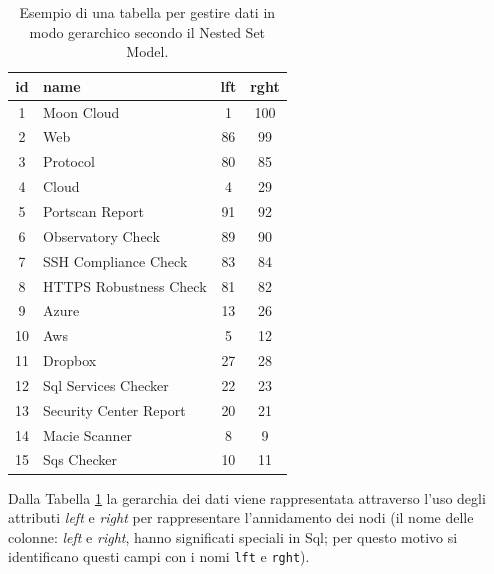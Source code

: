 \begin{table}[ht!]
\centering
\begin{tabular}[c]{| c | l | c | c |}
    \hline
    id & name & lft & rght \\ [0.5ex] 
    \hline
    \rowcolor{rootnodecell} 1 & Moon Cloud & 1 & 100 \\ [0.5ex] 
    \rowcolor{categorycell} 2 & Web & 86 & 99 \\ [0.5ex] 
    \rowcolor{categorycell} 3 & Protocol & 80 & 85 \\ [0.5ex] 
    \rowcolor{categorycell} 4 & Cloud & 4 & 29 \\ [0.5ex] 
    \rowcolor{evaluationcell} 5 & Portscan Report & 91 & 92 \\ [0.5ex] 
    \rowcolor{evaluationcell} 6 & Observatory Check & 89 & 90 \\ [0.5ex] 
    \rowcolor{evaluationcell} 7 & SSH Compliance Check & 83 & 84 \\ [0.5ex] 
    \rowcolor{evaluationcell} 8 & HTTPS Robustness Check & 81 & 82 \\ [0.5ex] 
    \rowcolor{categorycell} 9 & Azure & 13 & 26 \\ [0.5ex] 
    \rowcolor{categorycell} 10 & Aws & 5 & 12 \\ [0.5ex] 
    \rowcolor{categorycell} 11 & Dropbox & 27 & 28 \\ [0.5ex] 
    \rowcolor{evaluationcell} 12 & Sql Services Checker & 22 & 23 \\ [0.5ex] 
    \rowcolor{evaluationcell} 13 & Security Center Report & 20 & 21 \\ [0.5ex] 
    \rowcolor{evaluationcell} 14 & Macie Scanner & 8 & 9 \\ [0.5ex] 
    \rowcolor{evaluationcell} 15 & Sqs Checker & 10 & 11 \\ [0.5ex]
    \hline
\end{tabular}
\caption{Esempio di una tabella per gestire dati in modo gerarchico secondo il Nested Set Model.}
\label{table:nested_set_model_table}
\end{table}
\hfill\break
Dalla Tabella \ref{table:nested_set_model_table} la gerarchia dei dati viene rappresentata attraverso l'uso 
degli attributi \textit{left} e \textit{right} per rappresentare l'annidamento dei nodi (il nome delle colonne: \textit{left} e \textit{right}, hanno significati 
speciali in Sql; per questo motivo si identificano questi campi con i nomi \texttt{lft} e \texttt{rght}).
%
\newpage
%
